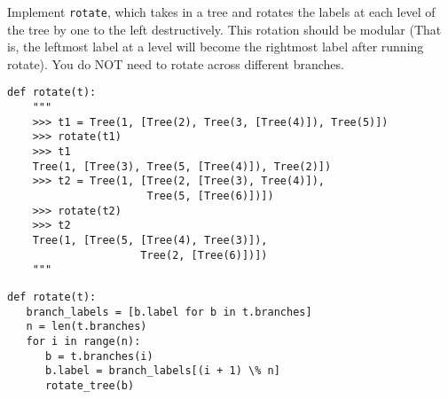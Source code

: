 \begin{blocksection}
\question Implement \texttt{rotate}, which takes in a tree and rotates the labels at each level of the tree by one to the left destructively. This rotation should be modular (That is, the leftmost label at a level will become the rightmost label after running rotate). You do NOT need to rotate across different branches.
\newline
\begin{lstlisting}
def rotate(t):
    """
    >>> t1 = Tree(1, [Tree(2), Tree(3, [Tree(4)]), Tree(5)])
    >>> rotate(t1)
    >>> t1
    Tree(1, [Tree(3), Tree(5, [Tree(4)]), Tree(2)])
    >>> t2 = Tree(1, [Tree(2, [Tree(3), Tree(4)]), 
                      Tree(5, [Tree(6)])])
    >>> rotate(t2)
    >>> t2
    Tree(1, [Tree(5, [Tree(4), Tree(3)]), 
                     Tree(2, [Tree(6)])])
    """
\end{lstlisting}
\begin{solution}
\begin{lstlisting}
def rotate(t):
   branch_labels = [b.label for b in t.branches]
   n = len(t.branches)
   for i in range(n):
      b = t.branches(i)
      b.label = branch_labels[(i + 1) \% n]
      rotate_tree(b)
\end{lstlisting}
\end{solution}
\end{blocksection}